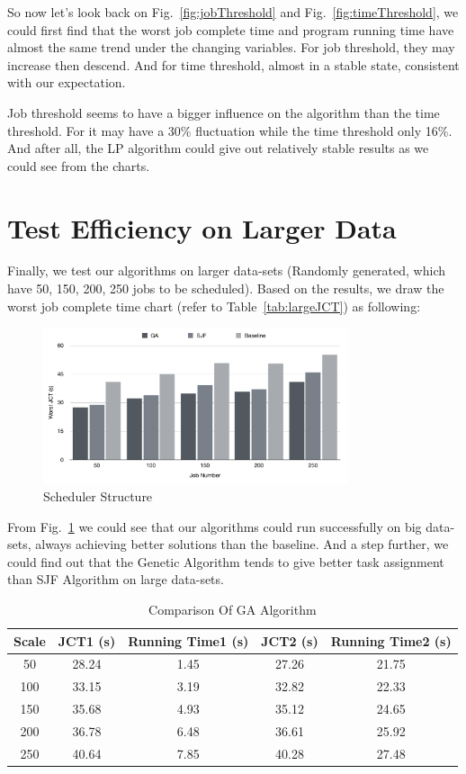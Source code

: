 \documentclass{llncs}
\begin{document}
So now let's look back on Fig.~\ref{fig:jobThreshold} and Fig.~\ref{fig:timeThreshold}, we could first find that the worst job complete time and program running time have almost the same trend under the changing variables. For job threshold, they may increase then descend. And for time threshold, almost in a stable state, consistent with our expectation.

Job threshold seems to have a bigger influence on the algorithm than the time threshold. For it may have a 30\% fluctuation while the time threshold only 16\%. And after all, the LP algorithm could give out relatively stable results as we could see from the charts.

\section{Test Efficiency on Larger Data}
Finally, we test our algorithms on larger data-sets (Randomly generated, which have 50, 150, 200, 250 jobs to be scheduled).  Based on the results, we draw the worst job complete time chart (refer to Table~\ref{tab:largeJCT}) as following:
\begin{figure}[htbp]
    \centering
    \includegraphics[width=0.8\textwidth]{Figures/largeJCT.pdf}
    \caption{Scheduler Structure}
    \label{fig:largeJCT}
\end{figure}

From Fig.~\ref{fig:largeJCT} we could see that our algorithms could run successfully on big data-sets, always achieving better solutions than the baseline. And a step further, we could find out that the Genetic Algorithm tends to give better task assignment than SJF Algorithm on large data-sets.

\begin{table}[htbp]
    \centering
    \caption{Comparison Of GA Algorithm}
    \begin{tabular}{|c|c|c|c|c|}
    \hline
        {\bf Scale} &JCT1 (s) &Running Time1 (s) &JCT2 (s) &Running Time2 (s) \\ \hline
        50 &28.24 &1.45 &27.26 &21.75 \\ \hline
        100 &33.15 &3.19 &32.82 &22.33 \\ \hline
        150 &35.68 &4.93 &35.12 &24.65 \\ \hline
        200 &36.78 &6.48 &36.61 &25.92 \\ \hline
        250 &40.64 &7.85 &40.28 &27.48 \\ \hline
    \end{tabular}
    \label{tab:GACmp}
\end{table}
\end{document}
